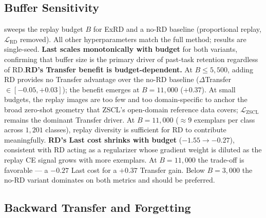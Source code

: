 \documentclass{article}
\begin{document}
 \subsection{Buffer Sensitivity}                             
  \label{sec:buffer} 
   sweeps the replay budget $B$ for ExRD and a no-RD baseline (proportional replay, $\mathcal{L}_{\text{RD}}$ removed). All other hyperparameters match the full method; results are single-seed.    
  \textbf{Last scales monotonically with budget} for both variants, confirming that buffer size is the primary driver of past-task retention regardless of RD.\textbf{RD's Transfer benefit is budget-dependent.} At $B \le 5{,}500$, adding                                                                                                              
  RD provides no Transfer advantage over the no-RD baseline ($\Delta$Transfer
  $\in [-0.05, +0.03]$); the benefit emerges at $B{=}11{,}000$ ($+0.37$). At small budgets, the replay images are too few and too domain-specific to anchor the broad zero-shot geometry that ZSCL's open-domain reference data covers; $\mathcal{L}_{\text{ZSCL}}$ remains the dominant Transfer driver. At $B{=}11{,}000$ (${\approx}9$ exemplars per class across $1{,}201$ classes), replay diversity is sufficient for RD to contribute meaningfully. \textbf{RD's Last cost shrinks with budget} ($-1.55 \to -0.27$), consistent with RD acting as a regularizer whose gradient weight is diluted as the replay CE signal grows with more exemplars. At $B{=}11{,}000$ the trade-off is favorable — a $-0.27$ Last cost for a $+0.37$ Transfer gain. Below $B{=}3{,}000$ the no-RD variant dominates on both metrics and should be preferred.
   
   \subsection{Backward Transfer and Forgetting}
  \label{sec:bwt}
\end{document}

